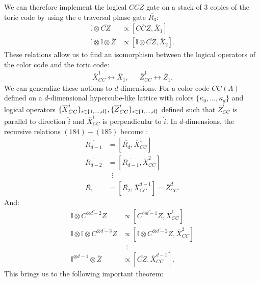\documentclass[12pt]{article}
\def\II{\mathbb{I}}
\theoremstyle{definition}
\begin{document}
We can therefore implement the logical $CCZ$ gate on a stack of 3 copies of the toric code by using the e traversal phase gate $\overline{R_3}$:
    \begin{align}
        \II\otimes\overline{CZ}&\propto[\overline{CCZ},\overline{X}_1]\\
        \II\otimes\II\otimes\overline{Z}&\propto[\II\otimes\overline{CZ},\overline{X}_2].
    \end{align}
These relations allow us to find an isomorphism between the logical operators of the color code and the toric code:
    \begin{align}
        \overline{X}^1_{CC}\leftrightarrow\overline{X}_1,\enspace\enspace\enspace \overline{Z}^1_{CC}\leftrightarrow\overline{Z}_1.
    \end{align}
We can generalize these notions to $d$ dimensions. For a color code $CC(\Lambda)$ defined on a $d$-dimensional hypercube-like lattice with colors $\{\kappa_0,...,\kappa_d\}$ and logical operators $\{\overline{X}^i_{CC}\}_{i\in\{1,...,d\}},\newline \{\overline{Z}^i_{CC}\}_{i\in\{1,...,d\}}$ defined such that $\overline{Z}^i_{CC}$ is parallel to direction $\hat{i}$ and $\overline{X}^i_{CC}$ is perpendicular to $\hat{i}$. In $d$-dimensions, the recursive relations $(184)-(185)$ become \cite{kubica2015}:
    \begin{align}
        \overline{R_{d-1}} &= [\overline{R_d}, \overline{X}^1_{CC}]\\
        \overline{R_{d-2}} &= [\overline{R_{d-1}}, \overline{X}^2_{CC}]\\
        &\enspace\vdots\\
        \overline{R_1} &= [\overline{R_2}, \overline{X}^{d-1}_{CC}] = \overline{Z}^d_{CC}.
    \end{align}
And:
    \begin{align}
        \II\otimes\overline{C^{\otimes d-2}Z}&\propto [\overline{C^{\otimes d-1}Z}, \overline{X}^1_{CC}]\\
        \II\otimes\II\otimes\overline{C^{\otimes d-3}Z}&\propto [\II\otimes\overline{C^{\otimes d-2}Z}, \overline{X}^2_{CC}]\\
        &\enspace\vdots\\
        \II^{\otimes d-1}\otimes\overline{Z}&\propto [\overline{CZ}, \overline{X}^{d-1}_{CC}].
    \end{align}
This brings us to the following important theorem:
\end{document}
